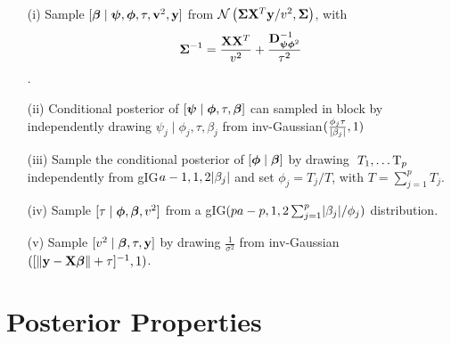 \documentclass[10pt]{article}
\def\sql{$\sqrt{\text{Lasso}}$}
\begin{document}
\begin{itemize}
\item[(i)] Sample $[ \boldsymbol{\beta} \mid \boldsymbol{\psi} , \boldsymbol{\phi} , \tau , {\bf v}^2 , {\bf y} ]$ from $\mathcal{N} \left( \boldsymbol{\Sigma} {\bf X}^T{\bf y}/v^2 , \boldsymbol{\Sigma} \right)$, with $$ \boldsymbol{\Sigma}^{-1} = \frac{{\bf X}{\bf X}^T}{v^2} + \frac{{\bf D}^{-1}_{\boldsymbol{\psi} \boldsymbol{\phi}^2}}{\tau^2} $$.

\item[(ii)]Conditional posterior of $[\boldsymbol{\psi} \mid \boldsymbol{\phi} , \tau , \boldsymbol{\beta}]$ can sampled in block  by independently drawing $ \psi_j \mid \phi_j , \tau , \beta_j $ from \rm{inv-Gaussian}$ (\frac{\phi_j\tau}{\lvert\beta_j\rvert} ,1) $

\item[(iii)] Sample the conditional posterior of $[ \boldsymbol{\phi} \mid \boldsymbol{\beta}]$ by drawing $ \ T_1, \ldots {\rm T}_p$ independently from \rm{gIG}$a-1 , 1 , 2\lvert\beta_j\rvert$ and set $\phi_j = T_j/T$, with $T = \sum_{j=1}^{p}T_j$.

\item[(iv)] Sample $[ \tau \mid \boldsymbol{\phi}, \boldsymbol{\beta}, v^2 ]$ from a \rm{gIG}$( pa-p , 1 , 2\sum^{p}_{j=1}\lvert\beta_j\rvert/\phi_j )$ distribution.

\item[(v)] Sample $[ v^2 \mid \boldsymbol{\beta} ,\tau , {\bf y} ]  $ by drawing $ \frac{1}{\sigma^2} $ from \rm{inv-Gaussian}$ ( [ \lVert{\bf y} - {\bf X}\boldsymbol{\beta}\rVert + \tau ]^{-1} ,1) $.
\end{itemize}



\section{Posterior Properties}\label{sec:post-prop}

%
%
\end{document}
